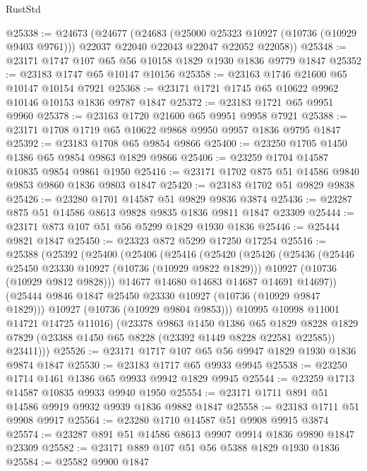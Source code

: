 \begin{lexlean}{RustStd}
\begin{coremodule}
@25338 := @24673
    (@24677
      (@24683
        (@25000 @25323 @10927 (@10736 (@10929 @9403 @9761)))
        @22037
        @22040
        @22043
        @22047
        @22052
        @22058))
@25348 := @23171 @1747 @107 @65 @56 @10158 @1829 @1930 @1836 @9779 @1847
@25352 := @23183 @1747 @65 @10147 @10156
@25358 := @23163 @1746 @21600 @65 @10147 @10154 @7921
@25368 := @23171 @1721 @1745 @65 @10622 @9962 @10146 @10153 @1836 @9787 @1847
@25372 := @23183 @1721 @65 @9951 @9960
@25378 := @23163 @1720 @21600 @65 @9951 @9958 @7921
@25388 := @23171 @1708 @1719 @65 @10622 @9868 @9950 @9957 @1836 @9795 @1847
@25392 := @23183 @1708 @65 @9854 @9866
@25400 := @23250 @1705 @1450 @1386 @65 @9854 @9863 @1829 @9866
@25406 := @23259 @1704 @14587 @10835 @9854 @9861 @1950
@25416 := @23171 @1702 @875 @51 @14586 @9840 @9853 @9860 @1836 @9803 @1847
@25420 := @23183 @1702 @51 @9829 @9838
@25426 := @23280 @1701 @14587 @51 @9829 @9836 @3874
@25436 := @23287 @875 @51 @14586 @8613 @9828 @9835 @1836 @9811 @1847 @23309
@25444 := @23171 @873 @107 @51 @56 @5299 @1829 @1930 @1836
@25446 := @25444 @9821 @1847
@25450 := @23323 @872 @5299 @17250 @17254
@25516 := @25388
    (@25392
      (@25400
        (@25406
          (@25416
            (@25420
              (@25426
                (@25436
                  (@25446 @25450 @23330 @10927 (@10736 (@10929 @9822 @1829)))
                  @10927
                  (@10736 (@10929 @9812 @9828)))
                @14677
                @14680
                @14683
                @14687
                @14691
                @14697))
            (@25444 @9846 @1847 @25450 @23330 @10927 (@10736 (@10929 @9847 @1829)))
            @10927
            (@10736 (@10929 @9804 @9853)))
          @10995
          @10998
          @11001
          @14721
          @14725
          @11016)
        (@23378
          @9863
          @1450
          @1386
          @65
          @1829
          @8228
          @1829
          @7829
          (@23388 @1450 @65 @8228 (@23392 @1449 @8228 @22581 @22585))
          @23411)))
@25526 := @23171 @1717 @107 @65 @56 @9947 @1829 @1930 @1836 @9874 @1847
@25530 := @23183 @1717 @65 @9933 @9945
@25538 := @23250 @1714 @1461 @1386 @65 @9933 @9942 @1829 @9945
@25544 := @23259 @1713 @14587 @10835 @9933 @9940 @1950
@25554 := @23171 @1711 @891 @51 @14586 @9919 @9932 @9939 @1836 @9882 @1847
@25558 := @23183 @1711 @51 @9908 @9917
@25564 := @23280 @1710 @14587 @51 @9908 @9915 @3874
@25574 := @23287 @891 @51 @14586 @8613 @9907 @9914 @1836 @9890 @1847 @23309
@25582 := @23171 @889 @107 @51 @56 @5388 @1829 @1930 @1836
@25584 := @25582 @9900 @1847

\end{coremodule}
\end{lexlean}
